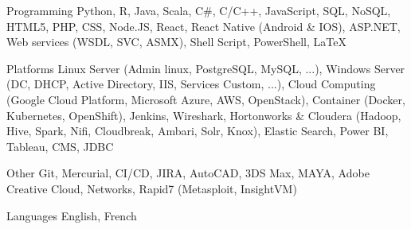 

\begin{cvskills}

  \cvskill
    {Programming}
	{Python, R, Java, Scala, C\#, C/C++, JavaScript, SQL, NoSQL, HTML5, PHP, CSS, Node.JS, React, React Native (Android \& IOS), ASP.NET, Web services (WSDL, SVC, ASMX), Shell Script, PowerShell, LaTeX}

  \cvskill
    {Platforms}
    {Linux Server (Admin linux, PostgreSQL, MySQL, ...), Windows Server (DC, DHCP, Active Directory, IIS, Services Custom, ...), Cloud Computing (Google Cloud Platform, Microsoft Azure, AWS, OpenStack), Container (Docker, Kubernetes, OpenShift), Jenkins, Wireshark, Hortonworks \& Cloudera (Hadoop, Hive, Spark, Nifi, Cloudbreak, Ambari, Solr, Knox), Elastic Search, Power BI, Tableau, CMS, JDBC}

  \cvskill
    {Other} %
    {Git, Mercurial, CI/CD, JIRA, AutoCAD, 3DS Max, MAYA, Adobe Creative Cloud, Networks, Rapid7 (Metasploit, InsightVM)}
	
  \cvskill
    {Languages}
    {English, French}

\end{cvskills}
